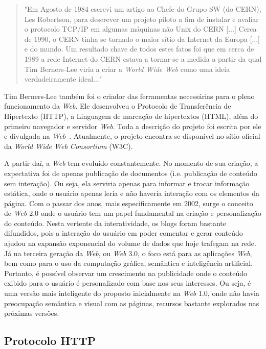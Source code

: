 \begin{quote}
\small{
"Em Agosto de 1984 escrevi um artigo ao Chefe do Grupo SW (do CERN), Les Robertson, para descrever um projeto piloto a fim de instalar e avaliar o protocolo TCP/IP em algumas máquinas não Unix do CERN [...] Cerca de 1990, o CERN tinha se tornado o maior sítio da Internet da Europa [...] e do mundo. Um resultado chave de todos estes fatos foi que em cerca de 1989 a rede Internet do CERN estava a tornar-se a medida a partir da qual Tim Berners-Lee viria a criar a \textit{World Wide Web} como uma ideia verdadeiramente ideal..."~
}
\end{quote}

Tim Berners-Lee também foi o criador das ferramentas necessárias para o pleno funcionamento da \textit{Web}. Ele desenvolveu o Protocolo de Transferência de Hipertexto (HTTP), a Linguagem de marcação de hipertextos (HTML), além do primeiro navegador e servidor \textit{Web}. Toda a descrição do projeto foi escrita por ele e divulgada na \textit{Web}~\cite{bernerslee1992}.  Atualmente, o projeto encontra-se disponível no sítio oficial da \textit{World Wide Web Consortium} (W3C).

A partir daí, a \textit{Web} tem evoluído constantemente. No momento de sua criação, a expectativa foi de apenas publicação de documentos (i.e. publicação de conteúdo sem interação). Ou seja, ela serviria apenas para informar e trocar informação estática, onde o usuário apenas leria e não haveria interação com os elementos da página. Com o passar dos anos, mais especificamente em 2002, surge o conceito de \textit{Web} 2.0 onde o usuário tem um papel fundamental na criação e personalização do conteúdo. Nesta vertente da interatividade, os blogs foram bastante difundidos, pois a interação do usuário em poder comentar e gerar conteúdo ajudou na expansão exponencial do volume de dados que hoje trafegam na rede. Já na terceira geração da \textit{Web}, ou \textit{Web} 3.0, o foco está para as aplicações \textit{Web}, bem como para o uso da computação gráfica, semântica e inteligência artificial. Portanto, é possível observar um crescimento na publicidade onde o conteúdo exibido para o usuário é personalizado com base nos seus interesses. Ou seja, é uma versão mais inteligente do proposto inicialmente na \textit{Web} 1.0, onde não havia preocupação semântica e visual com as páginas, recursos bastante explorados nas próximas versões.
%
%
%
\subsection{Protocolo HTTP}
\label{SubHTTP}

